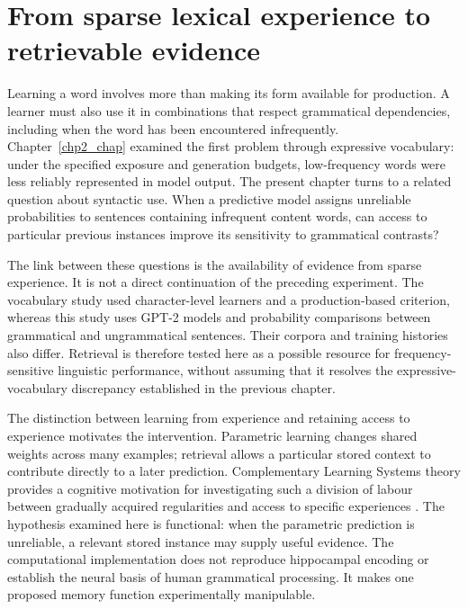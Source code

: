 \section{From sparse lexical experience to retrievable evidence}
\label{sec:ch4:thesis-introduction}

Learning a word involves more than making its form available for production. A learner must also use it in combinations that respect grammatical dependencies, including when the word has been encountered infrequently. Chapter~\ref{chp2_chap} examined the first problem through expressive vocabulary: under the specified exposure and generation budgets, low-frequency words were less reliably represented in model output. The present chapter turns to a related question about syntactic use. When a predictive model assigns unreliable probabilities to sentences containing infrequent content words, can access to particular previous instances improve its sensitivity to grammatical contrasts?

The link between these questions is the availability of evidence from sparse experience. It is not a direct continuation of the preceding experiment. The vocabulary study used character-level learners and a production-based criterion, whereas this study uses GPT-2 models and probability comparisons between grammatical and ungrammatical sentences. Their corpora and training histories also differ. Retrieval is therefore tested here as a possible resource for frequency-sensitive linguistic performance, without assuming that it resolves the expressive-vocabulary discrepancy established in the previous chapter.

The distinction between learning from experience and retaining access to experience motivates the intervention. Parametric learning changes shared weights across many examples; retrieval allows a particular stored context to contribute directly to a later prediction. Complementary Learning Systems theory provides a cognitive motivation for investigating such a division of labour between gradually acquired regularities and access to specific experiences \citep{mcclelland1995there,kumaran2016learning}. The hypothesis examined here is functional: when the parametric prediction is unreliable, a relevant stored instance may supply useful evidence. The computational implementation does not reproduce hippocampal encoding or establish the neural basis of human grammatical processing. It makes one proposed memory function experimentally manipulable.

